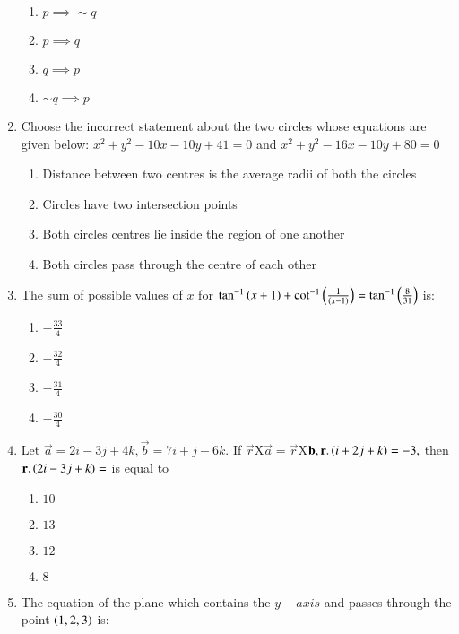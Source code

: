 \documentclass[journal,12pt,twocolumn]{IEEEtran}
\theoremstyle{remark}
\begin{document}
\begin{enumerate}
    \begin{enumerate}
        \item $p\implies\sim q$
        \item $p\implies q$
        \item $q\implies p$
        \item $\sim q\implies p$\\
    \end{enumerate}
    \item  Choose the incorrect statement about the two circles whose equations are given below: $x^2+y^2-10x-10y+41=0$ and $x^2+y^2-16x-10y+80=0$
    \begin{enumerate}
        \item  Distance between two centres is the average radii of both the circles
        \item Circles have two intersection points
        \item Both circles centres lie inside the region of one another
        \item Both circles pass through the centre of each other\\
    \end{enumerate}
    \item  The sum of possible values of $x$ for $\tan^{-1}\left(x+1\right)+\cot^{-1}\left(\frac{1}{\left(x-1\right)}\right)=\tan^{-1}\left(\frac{8}{31}\right)$ is:
    \begin{enumerate}
        \item $-\frac{33}{4}$
        \item $-\frac{32}{4}$
        \item $-\frac{31}{4}$
        \item $-\frac{30}{4}$\\
    \end{enumerate}
    \item Let $\vec{a}=2i-3j+4k,\vec{b}=7i+j-6k.$ If $\vec{r}$X$\vec{a}=\vec{r}$X$\mathbf{b},\mathbf{r}.\left(i+2j+k\right)=-3,$ then $\mathbf{r}.\left(2i-3j+k\right)=$ is equal to
    \begin{enumerate}
        \item $10$
        \item $13$
        \item $12$
        \item $8$
     \end{enumerate}
    \item The equation of the plane which contains the $y-axis$ and passes through the point $\left(1, 2, 3\right)$ is:
    \begin{enumerate}

\end{enumerate}
\end{enumerate}
\end{document}

